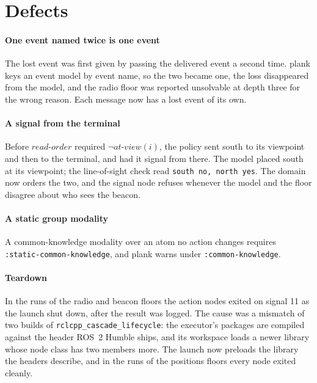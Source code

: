 \documentclass[11pt,a4paper]{article}
\theoremstyle{definition}
\newcommand{\code}[1]{\texttt{\small #1}}
\newcommand{\atview}{\mathit{at\text{-}view}}
\begin{document}
\section{Defects}
\label{sec:defects}

\paragraph{One event named twice is one event} The lost event was first given
by passing the delivered event a second time. plank keys an event model by
event name, so the two became one, the loss disappeared from the model, and the
radio floor was reported unsolvable at depth three for the wrong reason. Each
message now has a lost event of its own.

\paragraph{A signal from the terminal} Before $\mathit{read\text{-}order}$
required $\neg\atview(i)$, the policy sent south to its viewpoint and then to the
terminal, and had it signal from there. The model placed south at its
viewpoint; the line-of-sight check read \code{south no, north yes}. The domain
now orders the two, and the signal node refuses whenever the model and the floor
disagree about who sees the beacon.

\paragraph{A static group modality} A common-knowledge modality over an atom
no action changes requires \code{:static-common-knowledge}, and plank warns
under \code{:common-knowledge}.

\paragraph{Teardown} In the runs of the radio and beacon floors the action nodes
exited on signal 11 as the launch shut down, after the result was logged. The
cause was a mismatch of two builds of \code{rclcpp\_cascade\_lifecycle}: the
executor's packages are compiled against the header ROS~2 Humble ships, and its
workspace loads a newer library whose node class has two members more. The
launch now preloads the library the headers describe, and in the runs of the
positions floors every node exited cleanly.

\end{document}
